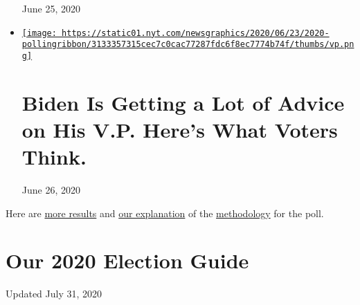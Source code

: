 \begin{itemize}
  June 25, 2020
\item
  \href{https://www.nytimes.com/2020/06/26/us/politics/biden-vice-president-voters.html}{\texttt{[image: https://static01.nyt.com/newsgraphics/2020/06/23/2020-pollingribbon/3133357315cec7c0cac77287fdc6f8ec7774b74f/thumbs/vp.png]}}

  \href{https://www.nytimes.com/2020/06/26/us/politics/biden-vice-president-voters.html}{}

  \hypertarget{biden-is-getting-a-lot-of-advice-on-his-vp-heres-what-voters-think}{%
  \section{Biden Is Getting a Lot of Advice on His V.P. Here's What
  Voters
  Think.}\label{biden-is-getting-a-lot-of-advice-on-his-vp-heres-what-voters-think}}

  June 26, 2020
\end{itemize}

Here are
\href{https://int.nyt.com/data/documenttools/crosstabs0624release/18307fed6cb2dc5a/full.pdf}{more
results} and
\href{https://www.nytimes.com/2020/06/23/upshot/poll-2020-election-method.html}{our
explanation} of the
\href{https://int.nyt.com/data/documenttools/nyt-siena-poll-methodology-june-2020/f6f533b4d07f4cbe/full.pdf}{methodology}
for the poll.

\hypertarget{our-2020-election-guide}{%
\section{Our 2020 Election Guide}\label{our-2020-election-guide}}

Updated July 31, 2020

